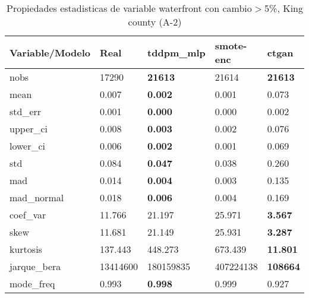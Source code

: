 \begin{table}[H]
\centering
\fontsize{8}{14}\selectfont
\caption{Propiedades estadisticas de variable waterfront con cambio\ensuremath{>}5\%, King county (A-2)}
\label{table-stats-king county-a-2-waterfront-short}
\begin{tabular}{|l|m{10em}|m{10em}|m{10em}|m{10em}|}
\hline
 \rowcolor[gray]{0.8}
Variable/Modelo & Real & tddpm\_mlp & smote-enc & ctgan \\
\hline nobs & 17290 & \bfseries 21613 & \cellcolor[rgb]{0.9, 0.54, 0.52} 21614 & \bfseries 21613 \\
\hline mean & 0.007 & \bfseries 0.002 & 0.001 & \cellcolor[rgb]{0.9, 0.54, 0.52} 0.073 \\
\hline std\_err & 0.001 & \bfseries 0.000 & 0.000 & \cellcolor[rgb]{0.9, 0.54, 0.52} 0.002 \\
\hline upper\_ci & 0.008 & \bfseries 0.003 & 0.002 & \cellcolor[rgb]{0.9, 0.54, 0.52} 0.076 \\
\hline lower\_ci & 0.006 & \bfseries 0.002 & 0.001 & \cellcolor[rgb]{0.9, 0.54, 0.52} 0.069 \\
\hline std & 0.084 & \bfseries 0.047 & 0.038 & \cellcolor[rgb]{0.9, 0.54, 0.52} 0.260 \\
\hline mad & 0.014 & \bfseries 0.004 & 0.003 & \cellcolor[rgb]{0.9, 0.54, 0.52} 0.135 \\
\hline mad\_normal & 0.018 & \bfseries 0.006 & 0.004 & \cellcolor[rgb]{0.9, 0.54, 0.52} 0.169 \\
\hline coef\_var & 11.766 & 21.197 & \cellcolor[rgb]{0.9, 0.54, 0.52} 25.971 & \bfseries 3.567 \\
\hline skew & 11.681 & 21.149 & \cellcolor[rgb]{0.9, 0.54, 0.52} 25.931 & \bfseries 3.287 \\
\hline kurtosis & 137.443 & 448.273 & \cellcolor[rgb]{0.9, 0.54, 0.52} 673.439 & \bfseries 11.801 \\
\hline jarque\_bera & 13414600 & 180159835 & \cellcolor[rgb]{0.9, 0.54, 0.52} 407224138 & \bfseries 108664 \\
\hline mode\_freq & 0.993 & \bfseries 0.998 & 0.999 & \cellcolor[rgb]{0.9, 0.54, 0.52} 0.927 \\
\hline
\end{tabular}
\end{table}
